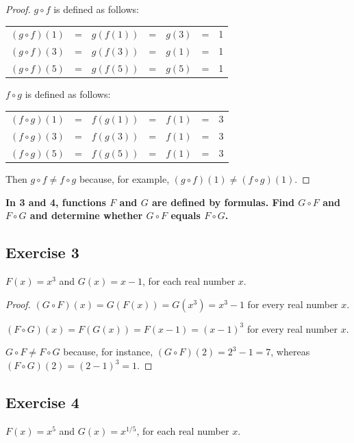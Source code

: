 \documentclass[14pt]{extarticle}
\newcommand{\cy}{\color{cyan}}
\begin{document}
\begin{proof}
\(g \circ f\) is defined as follows:

\begin{center}
\begin{tabular}{ccccccc}
\((g \circ f)(1)\) & = & \(g(f(1))\) & = & \(g(3)\) & = & 1\\
\((g \circ f)(3)\) & = & \(g(f(3))\) & = & \(g(1)\) & = & 1\\
\((g \circ f)(5)\) & = & \(g(f(5))\) & = & \(g(5)\) & = & 1\\
\end{tabular}
\end{center}

\(f \circ g\) is defined as follows:

\begin{center}
\begin{tabular}{ccccccc}
\((f \circ g)(1)\) & = & \(f(g(1))\) & = & \(f(1)\) & = & 3 \\
\((f \circ g)(3)\) & = & \(f(g(3))\) & = & \(f(1)\) & = & 3 \\
\((f \circ g)(5)\) & = & \(f(g(5))\) & = & \(f(1)\) & = & 3 \\
\end{tabular}
\end{center}

Then \(g \circ f \neq f \circ g\) because, for example, \((g \circ f)(1) \neq (f \circ g)(1)\).
\end{proof}

{\bf \cy In 3 and 4, functions $F$ and $G$ are defined by formulas. Find \(G \circ F\) and \(F \circ G\) and 
determine whether \(G \circ F\) equals \(F \circ G\).}

\subsection{Exercise 3}
\(F(x) = x^3\) and \(G(x) = x - 1\), for each real number $x$.

\begin{proof}
\((G \circ F)(x) = G(F(x)) = G(x^3) = x^3 - 1\) for every real number $x$.

\((F \circ G)(x) = F(G(x)) = F(x - 1) = (x - 1)^3\) for every real number $x$.

\(G \circ F \neq F \circ G\) because, for instance, \((G \circ F)(2) = 2^3 - 1 = 7\), 
whereas \((F \circ G)(2) = (2 - 1)^3 = 1\).
\end{proof}

\subsection{Exercise 4}
\(F(x) = x^5\) and \(G(x) = x^{1/5}\), for each real number $x$.
\end{document}
